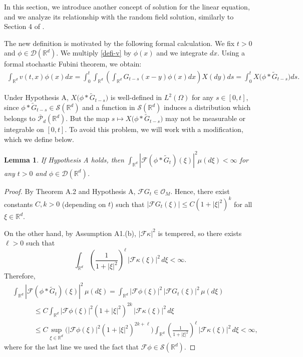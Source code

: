 \documentclass[12pt]{article}
\newtheorem{lemma}[theorem]{Lemma}
\def\cD{\mathcal{D}}
\def\cF{\mathcal{F}}
\def\cP{\mathcal{P}}
\def\cS{\mathcal{S}}
\def\bR{\mathbb{R}}
\def\k{\kappa}
\begin{document}
In this section, we introduce another concept of solution for the linear equation, and we analyze its relationship with the random field solution, similarly to Section 4 of \cite{dalang99}.

\medskip

The new definition is motivated by the following formal calculation. We fix $t>0$ and $\phi \in \cD(\bR^d)$. We multiply \eqref{defi-v} by $\phi(x)$ and we integrate $dx$. Using a formal stochastic Fubini theorem, we obtain:
\begin{align*}
\int_{\bR^d}v(t,x)\phi(x)dx=\int_0^t \int_{\bR^d} \left(\int_{\bR^d} G_{t-s}(x-y)\phi(x)dx\right) X(dy)ds
=\int_0^t X\big(\phi* \widetilde{G}_{t-s}\big)ds.
\end{align*}

Under Hypothesis A, $X\big(\phi* \widetilde{G}_{t-s}\big)$ is well-defined in $L^2(\Omega)$ for any $s \in [0,t]$, since $\phi* \widetilde{G}_{t-s} \in \cS(\bR^d)$ and a function in $\cS(\bR^d)$ induces a distribution which belongs to $\overline{\cP}_d(\bR^d)$. But the map $s \mapsto X\big(\phi* \widetilde{G}_{t-s}\big)$ may not be measurable or integrable on $[0,t]$. To avoid this problem, we will work with a modification, which we define below.


\medskip


\begin{lemma}
If Hypothesis A holds, then $\int_{\bR^d}|\cF(\phi* \widetilde{G}_{t})(\xi)|^2 \mu(d\xi)
<\infty$ for any $t>0$ and $\phi \in \cD(\bR^d)$.
\end{lemma}


\begin{proof} By Theorem A.2 and Hypothesis A, $\cF G_t \in \mathcal O_M$. Hence, there exist constants $C,k>0$ (depending on $t$) such that $|\cF G_t(\xi)| \le C(1+|\xi|^2)^k$ for all $\xi\in \bR^d$.

On the other hand, by Assumption A1.(b), $|\cF \k|^2$ is tempered, so there exists $\ell>0$ such that
\[
\int_{\bR^d} \left(\frac{1}{1+|\xi|^2}\right)^{\ell}\,|\cF \k(\xi)|^2\,d\xi < \infty.
\]
Therefore,
\begin{equation*}
\begin{aligned}
& \int_{\bR^d} |\cF(\phi*\widetilde{G}_{t})(\xi)|^2\,\mu(d\xi)
 = \int_{\bR^d} |\cF\phi(\xi)|^2\,|\cF G_{t}(\xi)|^2\,\mu(d\xi) \\
& \quad \quad \quad \le C \int_{\bR^d} |\cF\phi(\xi)|^2 (1+|\xi|^2)^{2k}\,|\cF \k(\xi)|^2\,d\xi \\
& \quad \quad \quad \le C \sup_{\xi\in\bR^d}\Big(|\cF\phi(\xi)|^2 (1+|\xi|^2)^{2k+\ell}\Big)
\int_{\bR^d} \left(\frac{1}{1+|\xi|^2}\right)^{\ell}\,|\cF \k(\xi)|^2\,d\xi < \infty,
\end{aligned}
\end{equation*}
where for the last line we used the fact that $\cF\phi\in \cS(\bR^d)$.
\end{proof}
\end{document}
